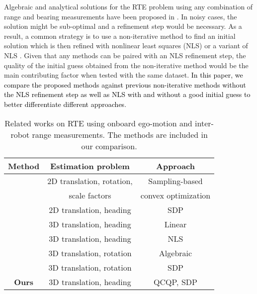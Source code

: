 \documentclass[journal]{IEEEtran}
\begin{document}
Algebraic and analytical solutions for the RTE problem using any combination of range and bearing measurements have been proposed in \cite{zhou2013relrangebearing,knuth2014relanycombinations}. In noisy cases, the solution might be sub-optimal and a refinement step would be necessary. As a result, a common strategy is to use a non-iterative method to find an initial solution which is then refined with nonlinear least squares (NLS) or a variant of NLS \cite{molina2019unique,li2020relSDP,jiang2020rel3D,trawny2010relplanar}. Given that any methods can be paired with an NLS refinement step, the quality of the initial guess obtained from the non-iterative method would be the main contributing factor when tested with the same dataset. \textcolor{black}{In this paper, we compare the proposed methods against previous non-iterative methods without the NLS refinement step as well as NLS with and without a good initial guess to better differentiate different approaches}.

\begin{table}[t]
\begin{adjustbox}{width=\columnwidth}
    \begin{tabular}[t]{ c|c|c}
    \toprule
        Method & Estimation problem & Approach \\
    \hline
        \multirow{2}{*}{\cite{shariati2016recovering}} & 2D translation, rotation, & Sampling-based \\
        & scale factors & convex optimization \\
    \hline
        \cite{li2020relSDP} & 2D translation, heading & SDP \\
    \hline
        \cite{molina2019unique} & 3D translation, heading & Linear \\
    \hline
        \cite{ziegler2021distributed} & 3D translation, heading & NLS \\
    \hline
        \cite{trawny2010rel3Dtransform} & 3D translation, rotation & Algebraic \\
    \hline
        \cite{jiang2020rel3D} & 3D translation, rotation & SDP \\
    \hline
        \textbf{Ours} & 3D translation, heading & QCQP, SDP \\
    \bottomrule
    \end{tabular}
\end{adjustbox}
\caption{Related works on RTE using onboard ego-motion and inter-robot range measurements. The methods \cite{molina2019unique,ziegler2021distributed,trawny2010rel3Dtransform,jiang2020rel3D} are included in our comparison.}
\label{table:lit_review}
\end{table}
\end{document}
